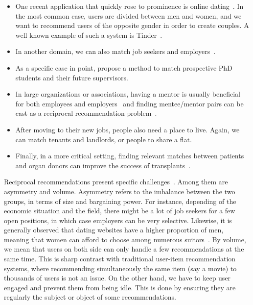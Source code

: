 \begin{itemize}
  \item One recent application that quickly rose to prominence is online
    dating~\autocites{Krzywicki2015}{Xia2016a}{Alanazi}. In the most common case, users are divided
    between men and women, and we want to recommend users of the opposite gender in order to create
    couples. A well known example of such a system is Tinder~\autocite{TinderDesc16}.
  \item In another domain, we can also match job seekers and
    employers~\autocites{Siting2012}{Hong2013}{Kille2015}.
  \item As a specific case in point, \textcite{Zhang2016a} propose a method to match prospective PhD
    students and their future supervisors.
  \item In large organizations or associations, having a mentor is usually beneficial for
    both employees and employers~\autocite{mentorBenef04} and finding mentee/mentor pairs can be
    cast as a reciprocal recommendation problem~\autocite{OSSMentors12}.
  \item After moving to their new jobs, people also need a place to live. Again, we can match
    tenants and landlords, or people to share a flat.
  \item Finally, in a more critical setting, finding relevant matches between patients and organ
    donors can improve the success of transplants~\autocite{patientDonor17}.
\end{itemize}

Reciprocal recommendations present specific challenges~\autocite{Andrews2015}. Among them are
asymmetry and volume.  Asymmetry refers to the imbalance between the two groups, in terms of size
and bargaining power. For instance, depending of the economic situation and the field, there might
be a lot of job seekers for a few open positions, in which case employers can be very selective.
Likewise, it is generally observed that dating websites have a higher proportion of men, meaning
that women can afford to choose among numerous suitors~\autocite{TinderDesc16}. By volume, we mean
that users on both side can only handle a few recommendations at the same time. This is sharp
contrast with traditional user-item recommendation systems, where recommending simultaneously the
same item (say a movie) to thousands of users is not an issue. On the other hand, we have to keep
user engaged and prevent them from being idle. This is done by ensuring they are regularly the
subject or object of some recommendations.

